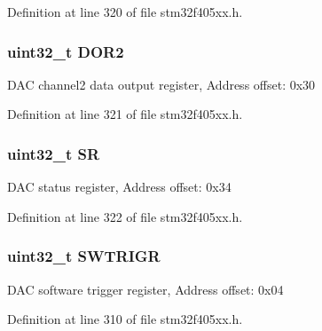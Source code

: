 Definition at line 320 of file stm32f405xx.\+h.

\subsubsection[{\texorpdfstring{D\+O\+R2}{DOR2}}]{ uint32\+\_\+t D\+O\+R2}\hypertarget{struct_d_a_c___type_def_aba9fb810b0cf6cbc1280c5c63be2418b}{}\label{struct_d_a_c___type_def_aba9fb810b0cf6cbc1280c5c63be2418b}
D\+AC channel2 data output register, Address offset\+: 0x30 

Definition at line 321 of file stm32f405xx.\+h.

\subsubsection[{\texorpdfstring{SR}{SR}}]{ uint32\+\_\+t SR}\hypertarget{struct_d_a_c___type_def_af6aca2bbd40c0fb6df7c3aebe224a360}{}\label{struct_d_a_c___type_def_af6aca2bbd40c0fb6df7c3aebe224a360}
D\+AC status register, Address offset\+: 0x34 

Definition at line 322 of file stm32f405xx.\+h.

\subsubsection[{\texorpdfstring{S\+W\+T\+R\+I\+GR}{SWTRIGR}}]{ uint32\+\_\+t S\+W\+T\+R\+I\+GR}\hypertarget{struct_d_a_c___type_def_a896bbb7153af0b67ad772360feaceeb4}{}\label{struct_d_a_c___type_def_a896bbb7153af0b67ad772360feaceeb4}
D\+AC software trigger register, Address offset\+: 0x04 

Definition at line 310 of file stm32f405xx.\+h.



